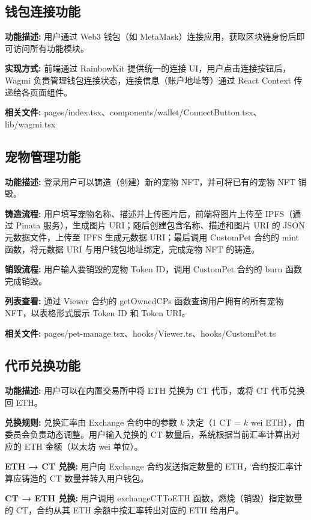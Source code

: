 \documentclass{mancls}
\begin{document}
\subsection{钱包连接功能}

\textbf{功能描述:} 用户通过 Web3 钱包（如 MetaMask）连接应用，获取区块链身份后即可访问所有功能模块。

\textbf{实现方式:} 前端通过 RainbowKit 提供统一的连接 UI，用户点击连接按钮后，Wagmi 负责管理钱包连接状态，连接信息（账户地址等）通过 React Context 传递给各页面组件。

\textbf{相关文件:} pages/index.tsx、components/wallet/ConnectButton.tsx、lib/wagmi.tsx

\subsection{宠物管理功能}

\textbf{功能描述:} 登录用户可以铸造（创建）新的宠物 NFT，并可将已有的宠物 NFT 销毁。

\textbf{铸造流程:} 用户填写宠物名称、描述并上传图片后，前端将图片上传至 IPFS（通过 Pinata 服务），生成图片 URI；随后创建包含名称、描述和图片 URI 的 JSON 元数据文件，上传至 IPFS 生成元数据 URI；最后调用 CustomPet 合约的 mint 函数，将元数据 URI 与用户钱包地址绑定，完成宠物 NFT 的铸造。

\textbf{销毁流程:} 用户输入要销毁的宠物 Token ID，调用 CustomPet 合约的 burn 函数完成销毁。

\textbf{列表查看:} 通过 Viewer 合约的 getOwnedCPs 函数查询用户拥有的所有宠物 NFT，以表格形式展示 Token ID 和 Token URI。

\textbf{相关文件:} pages/pet-manage.tsx、hooks/Viewer.ts、hooks/CustomPet.ts

\subsection{代币兑换功能}

\textbf{功能描述:} 用户可以在内置交易所中将 ETH 兑换为 CT 代币，或将 CT 代币兑换回 ETH。

\textbf{兑换规则:} 兑换汇率由 Exchange 合约中的参数 $k$ 决定（1 CT = $k$ wei ETH），由委员会负责动态调整。用户输入兑换的 CT 数量后，系统根据当前汇率计算出对应的 ETH 金额（以太坊 wei 单位）。

\textbf{ETH → CT 兑换:} 用户向 Exchange 合约发送指定数量的 ETH，合约按汇率计算应铸造的 CT 数量并转入用户钱包。

\textbf{CT → ETH 兑换:} 用户调用 exchangeCTToETH 函数，燃烧（销毁）指定数量的 CT，合约从其 ETH 余额中按汇率转出对应的 ETH 给用户。
\end{document}
